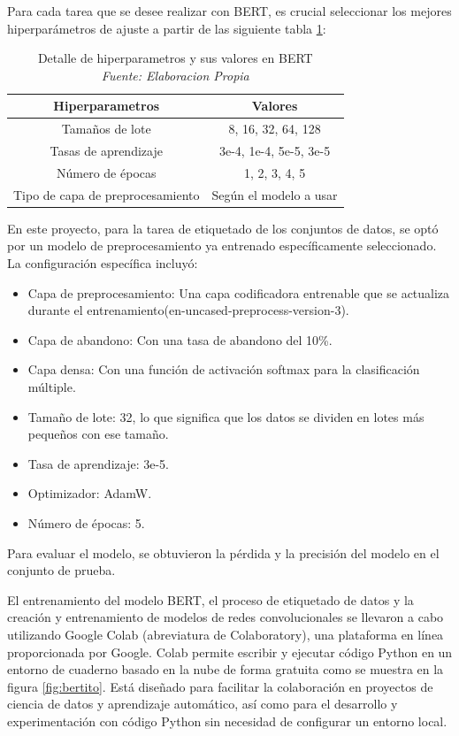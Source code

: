 Para cada tarea que se desee realizar con BERT, es crucial seleccionar los mejores hiperparámetros de ajuste a partir de las siguiente tabla \ref{tbl:2}:

\begin{table}[!ht]
	\centering
	\begin{tabular}{|c|c|}
		\hline
		\textbf{Hiperparametros} & \textbf{Valores} \\ \hline
		Tamaños de lote & 8, 16, 32, 64, 128 \\ \hline
		Tasas de aprendizaje & 3e-4, 1e-4, 5e-5, 3e-5 \\ \hline
		Número de épocas &  1, 2, 3, 4, 5 \\ \hline
		Tipo de capa de preprocesamiento & Según el modelo a usar \\ \hline
	\end{tabular}
	\caption{Detalle de hiperparametros y sus valores en BERT
		\\\textit{Fuente: Elaboracion Propia}}
	\label{tbl:2}
\end{table}

En este proyecto, para la tarea de etiquetado de los conjuntos de datos, se optó por un modelo de preprocesamiento ya entrenado específicamente seleccionado. La configuración específica incluyó:

\begin{itemize}

\item Capa de preprocesamiento: Una capa codificadora entrenable que se actualiza durante el entrenamiento(en-uncased-preprocess-version-3).
\item Capa de abandono: Con una tasa de abandono del 10\%.
\item Capa densa: Con una función de activación softmax para la clasificación múltiple.
\item Tamaño de lote: 32, lo que significa que los datos se dividen en lotes más pequeños con ese tamaño.
\item Tasa de aprendizaje: 3e-5.
\item Optimizador: AdamW.
\item Número de épocas: 5.

\end{itemize}

Para evaluar el modelo, se obtuvieron la pérdida y la precisión del modelo en el conjunto de prueba.

El entrenamiento del modelo BERT, el proceso de etiquetado de datos y la creación y entrenamiento de modelos de redes convolucionales se llevaron a cabo utilizando Google Colab (abreviatura de Colaboratory), una plataforma en línea proporcionada por Google. Colab permite escribir y ejecutar código Python en un entorno de cuaderno basado en la nube de forma gratuita como se muestra en la figura \ref{fig:bertito}. Está diseñado para facilitar la colaboración en proyectos de ciencia de datos y aprendizaje automático, así como para el desarrollo y experimentación con código Python sin necesidad de configurar un entorno local.

